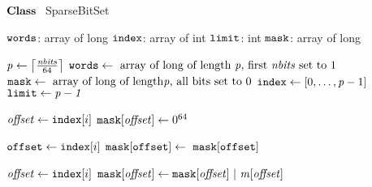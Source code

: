     \STATE $\textbf{Class~}$ SparseBitSet
    \item[]
      \STATE $\texttt{words}$: array of long  \label{line:sbsfield:start}
      \STATE $\texttt{index}$: array of int 
      \STATE $\texttt{limit}$: int 
      \STATE $\texttt{mask}$: array of long  \label{line:sbsfield:end}

    \item[]
     \label{line:initsbs:start}
      \STATE $\mathit{p} \leftarrow \left\lceil\frac{\mathit{nbits}}{64}\right\rceil$
      \STATE $\texttt{words} \leftarrow \text{~array of long of length~} \mathit{p} \text{, first~} 
      \mathit{nbits} \text{~set to 1}$
      \STATE $\texttt{mask} \leftarrow \text{~array of long of length} \mathit{p} \text{, all bits set to~}0$
      \STATE $\texttt{index} \leftarrow [0, \ldots, \mathit{p} - 1]$
      \STATE $\texttt{limit} \leftarrow \mathit{p-1}$ \label{line:initsbs:end}
      \Endfunc

    \item[]
       \label{line:isEmpty:1}
       \label{line:isEmpty:2}
      \Endfunc
    \item[]
       \label{line:clearMask:1}
       \label{line:clearMask:2}
        \STATE $\mathit{offset} \leftarrow \texttt{index}[i]$ \label{line:clearMask:3}
        \STATE $\texttt{mask}[\mathit{offset}] \leftarrow 0^{64}$ \label{line:clearMask:4}
      \ENDFOR
      \Endfunc

    \item[]
       \label{line:reverse:1}
       \label{line:reverse:2}
      \STATE $\texttt{offset} \leftarrow \texttt{index}[i]$ \label{line:reverse:3}
      \STATE $\texttt{mask}[\texttt{offset}] \leftarrow ~\texttt{mask}[\texttt{offset}]$  \label{line:reverse:4}
      \ENDFOR
      \Endfunc




    \item[]
       \label{line:addToMask:1}
       \label{line:addToMask:2}
      \STATE $\mathit{offset} \leftarrow \texttt{index}[i]$ \label{line:addToMask:3}
      \STATE $\texttt{mask}[\localvar{offset}] \leftarrow \texttt{mask}[\localvar{offset}] \ | \ 
      \localvar{m}[\localvar{offset}]$  \label{line:addToMask:4}
      \ENDFOR
      \Endfunc

